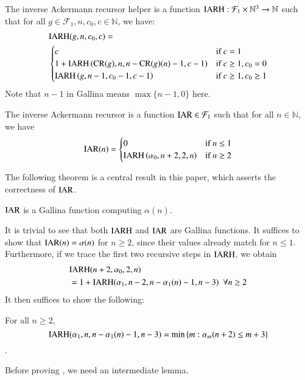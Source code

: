 \begin{defn}  \label{defn: inv_ack_recursor_helper}
The inverse Ackermann recursor helper is a function $\text{IARH} : \mathcal{F}_1\times \mathbb{N}^3 \to \mathbb{N}$ such that for all $g\in \mathcal{F}_1, n, c_0, c\in \mathbb{N}$, we have:
\begin{equation}
\begin{aligned}
& \text{IARH}(g, n, c_0, c) =  \\
& \begin{cases}
c & \text{if } c = 1 \\
1 + \text{IARH}\left(\text{CR}(g), n, n - \text{CR}(g)(n) - 1, c - 1\right) & \text{if } c \ge 1, c_0 = 0 \\
\text{IARH}\left(g, n - 1, c_0 - 1, c - 1\right) & \text{if } c \ge 1, c_0 \ge 1
\end{cases}
\end{aligned}
\end{equation}
Note that $n - 1$ in Gallina means $\max\{n-1, 0\}$ here.
\end{defn}

\begin{defn}  \label{defn: inv_ack_recursor}
The inverse Ackermann recursor is a function $\text{IAR} \in \mathcal{F}_1$ such that for all $n\in \mathbb{N}$, we have
\begin{equation}
\text{IAR}(n) = \begin{cases}
0 & \text{if } n \le 1 \\ \text{IARH}\left(\alpha_0, n + 2, 2, n\right) & \text{if } n\ge 2
\end{cases}
\end{equation}
\end{defn}

The following theorem is a central result in this paper, which asserts the correctness of $\text{IAR}$.

\begin{thm} \label{thm: inv_ack_correct}
$\text{IAR}$ is a Gallina function computing $\alpha(n)$.
\end{thm}

It is trivial to see that both $\text{IARH}$ and $\text{IAR}$ are Gallina functions. It suffices to show that $\text{IAR}(n) = \alpha(n)$ for $n\ge 2$, since their values already match for $n\le 1$. Furthermore, if we trace the first two recursive steps in $\text{IARH}$, we obtain
\begin{equation*}
\begin{aligned}
& \text{IARH}(n+2, \alpha_0, 2, n) \\
& = 1 + \text{IARH}(\alpha_1, n-2, n-\alpha_1(n)-1, n-3) \ \ \forall n\ge 2
\end{aligned}
\end{equation*}
It then suffices to show the following:

\begin{lem}  \label{lem: inv_ack_rec_helper}
For all $n\ge 2$,
$$\text{IARH}(\alpha_1, n, n - \alpha_1(n) - 1, n - 3) = \min\left\{m : \alpha_m(n+2)\le m+3 \right\}$$.
\end{lem}

Before proving , we need an intermediate lemma.

